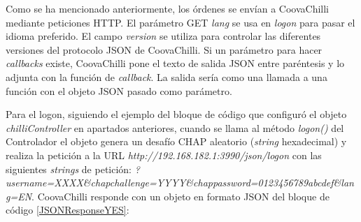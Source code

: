 Como se ha mencionado anteriormente, los órdenes se envían a CoovaChilli mediante peticiones HTTP. El parámetro GET \emph{lang} se usa en \emph{logon} para pasar el idioma preferido. El campo \emph{version} se utiliza para controlar las diferentes versiones del protocolo JSON de CoovaChilli. Si un parámetro para hacer \emph{callbacks} existe, CoovaChilli pone el texto de salida JSON entre paréntesis y lo adjunta con la función de \emph{callback}. La salida sería como una llamada a una función con el objeto JSON pasado como parámetro.

Para el logon, siguiendo el ejemplo del bloque de código que configuró el objeto \emph{chilliController} en apartados anteriores, cuando se llama al método \emph{logon()} del Controlador el objeto genera un desafío CHAP aleatorio (\emph{string} hexadecimal) y realiza la petición a la \acrshort{URL} \emph{http://192.168.182.1:3990/json/logon} con las siguientes \emph{strings} de petición: \emph{?username=XXXX\&chapchallenge=YYYY\&chappassword=0123456789abcdef\&lang=EN}.
CoovaChilli responde con un objeto en formato JSON del bloque de código \ref{JSONResponseYES}:


